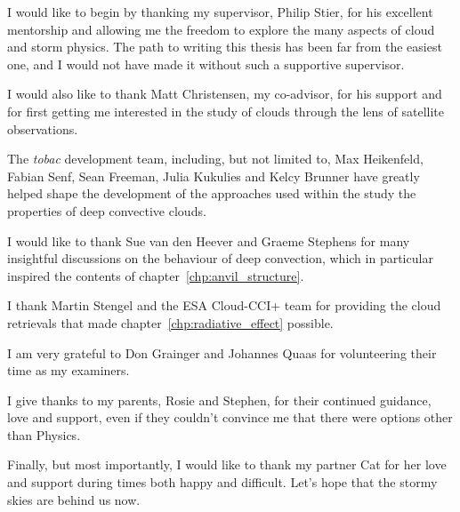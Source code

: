 \begin{acknowledgements}

I would like to begin by thanking my supervisor, Philip Stier, for his excellent mentorship and allowing me the freedom to explore the many aspects of cloud and storm physics.
The path to writing this thesis has been far from the easiest one, and I would not have made it without such a supportive supervisor.

I would also like to thank Matt Christensen, my co-advisor, for his support and for first getting me interested in the study of clouds through the lens of satellite observations.

The \textit{tobac} development team, including, but not limited to, Max Heikenfeld, Fabian Senf, Sean Freeman, Julia Kukulies and Kelcy Brunner have greatly helped shape the development of the approaches used within the study the properties of deep convective clouds.

I would like to thank Sue van den Heever and Graeme Stephens for many insightful discussions on the behaviour of deep convection, which in particular inspired the contents of chapter~\ref{chp:anvil_structure}.

I thank Martin Stengel and the ESA Cloud-CCI+ team for providing the cloud retrievals that made chapter~\ref{chp:radiative_effect} possible.

I am very grateful to Don Grainger and Johannes Quaas for volunteering their time as my examiners.

I give thanks to my parents, Rosie and Stephen, for their continued guidance, love and support, even if they couldn't convince me that there were options other than Physics.

Finally, but most importantly, I would like to thank my partner Cat for her love and support during times both happy and difficult.
Let's hope that the stormy skies are behind us now.


\end{acknowledgements}